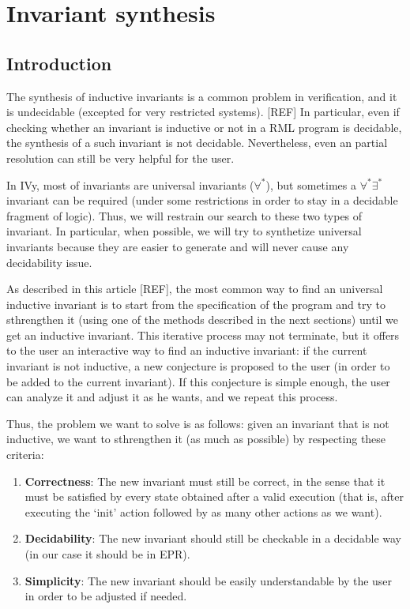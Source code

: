 \documentclass[11pt,a4paper,oldfontcommands,openany]{memoir}
\begin{document}
\chapter{Invariant synthesis}

    \section{Introduction}

    The synthesis of inductive invariants is a common problem in verification, and it is undecidable (excepted for very restricted systems). [REF]
    In particular, even if checking whether an invariant is inductive or not in a RML program is decidable, the synthesis of a such invariant is not decidable.
    Nevertheless, even an partial resolution can still be very helpful for the user.

    In IVy, most of invariants are universal invariants (\(\forall^*\)), but sometimes a \(\forall^*\exists^*\) invariant can be required (under some restrictions in order
    to stay in a decidable fragment of logic). Thus, we will restrain our search to these two types of invariant.
    In particular, when possible, we will try to synthetize universal invariants because they are easier to generate and will never cause any decidability issue.
    
    As described in this article [REF], the most common way to find an universal inductive invariant is to start from the specification of the program
    and try to sthrengthen it (using one of the methods described in the next sections) until we get an inductive invariant.
    This iterative process may not terminate, but it offers to the user an interactive way to find an inductive invariant:
    if the current invariant is not inductive, a new conjecture is proposed to the user (in order to be added to the current invariant).
    If this conjecture is simple enough, the user can analyze it and adjust it as he wants, and we repeat this process.

    Thus, the problem we want to solve is as follows:
    given an invariant that is not inductive, we want to sthrengthen it (as much as possible) by respecting these criteria:
    \begin{enumerate}
        \item \textbf{Correctness}: The new invariant must still be correct, in the sense that it must be satisfied by every state obtained
        after a valid execution (that is, after executing the `init' action followed by as many other actions as we want).
        \item \textbf{Decidability}: The new invariant should still be checkable in a decidable way (in our case it should be in EPR).
        \item \textbf{Simplicity}: The new invariant should be easily understandable by the user in order to be adjusted if needed.
    \end{enumerate}
\end{document}

